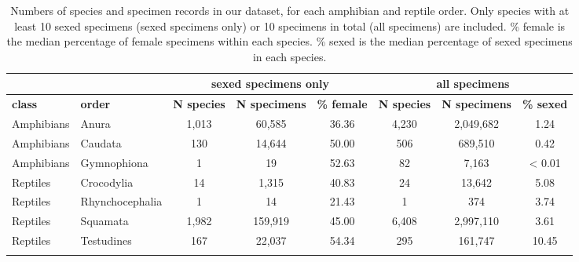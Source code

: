\begin{longtable}{llcccccc}
\caption{Numbers of species and specimen records in our dataset, for each amphibian and reptile order. Only species with at least 10 sexed specimens (sexed specimens only) or 10 specimens in total (all specimens) are included. \% female is the median percentage of female specimens within each species. \% sexed is the median percentage of sexed specimens in each species.} \\ 
  \hline
  & & \multicolumn{3}{c}{\textbf{sexed specimens only}} & \multicolumn{3}{c}{\textbf{all specimens}} \\
  \hline
  \textbf{class} & \textbf{order} & \textbf{N species} & \textbf{N specimens} & \textbf{\% female} & \textbf{N species} & \textbf{N specimens} & \textbf{\% sexed}\\
Amphibians &
Anura &
1,013 &
60,585  &
36.36 &
4,230 &
2,049,682 &
1.24\\
Amphibians &
Caudata &
130 &
14,644  &
50.00 &
506 &
689,510 &
0.42 \\
Amphibians &
Gymnophiona &
1 &
19 &
52.63 &
82 &
7,163 &
< 0.01\\

\hline

Reptiles &
Crocodylia &
14 &
1,315 &
40.83 &
24 &
13,642 &
5.08\\
Reptiles &
Rhynchocephalia &
1 &
14 &
21.43  &
1 &
374 &
3.74 \\
Reptiles &
Squamata  &
1,982 &
159,919  &
45.00 &
6,408 &
2,997,110 &
3.61 \\
Reptiles &
Testudines  &
167 &
22,037 &
54.34 &
295 &
161,747 &
10.45\\
\hline
\label{table-percents}
\end{longtable}